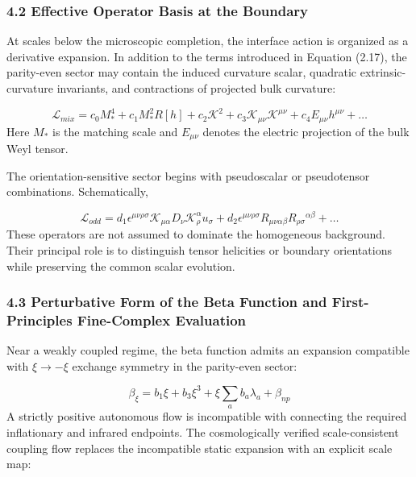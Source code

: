 \documentclass[aps,prd,onecolumn,superscriptaddress,nofootinbib,longbibliography,10pt]{revtex4-2}
\begin{document}
  
\subsubsection*{4.2 Effective Operator Basis at the Boundary}

  At scales below the microscopic completion, the interface action is organized as a derivative expansion. In addition to the terms introduced in Equation (2.17), the parity-even sector may contain the induced curvature scalar, quadratic extrinsic-curvature invariants, and contractions of projected bulk curvature:


  \[ \mathcal{L}_{mix} = c_0 M_*^4 + c_1 M_*^2 R[h] + c_2 \mathcal{K}^2 + c_3 \mathcal{K}_{\mu\nu}\mathcal{K}^{\mu\nu} + c_4 E_{\mu\nu} h^{\mu\nu} + \dots \]
  Here \(M_*\) is the matching scale and \(E_{\mu\nu}\) denotes the electric projection of the bulk Weyl tensor.


  The orientation-sensitive sector begins with pseudoscalar or pseudotensor combinations. Schematically,


  \[ \mathcal{L}_{odd} = d_1 \epsilon^{\mu\nu\rho\sigma} \mathcal{K}_{\mu\alpha} D_\nu \mathcal{K}^\alpha_\rho u_\sigma + d_2 \epsilon^{\mu\nu\rho\sigma} R_{\mu\nu\alpha\beta} R_{\rho\sigma}{}^{\alpha\beta} + \dots \]
  These operators are not assumed to dominate the homogeneous background. Their principal role is to distinguish tensor helicities or boundary orientations while preserving the common scalar evolution.



  
\subsubsection*{4.3 Perturbative Form of the Beta Function and First-Principles Fine-Complex Evaluation}

  Near a weakly coupled regime, the beta function admits an expansion compatible with \(\xi \to -\xi\) exchange symmetry in the parity-even sector:


  \[ \beta_\xi = b_1 \xi + b_3 \xi^3 + \xi \sum_a b_a \lambda_a + \beta_{np} \]
  A strictly positive autonomous flow is incompatible with connecting the required inflationary and infrared endpoints. The cosmologically verified scale-consistent coupling flow replaces the incompatible static expansion with an explicit scale map:
\end{document}
